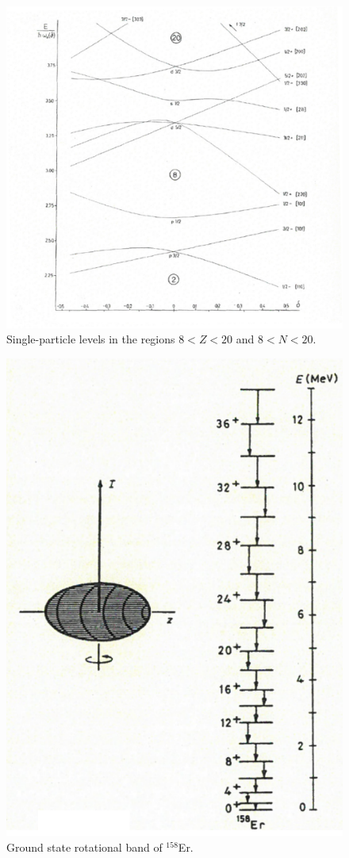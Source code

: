 \begin{figure}
	\centerline {
		\includegraphics*[width=15cm, angle=0.]{introduccion/figs/fig0_4_2_v4}
	}
	\caption{Single-particle levels in the regions $8<Z<20$ and $8<N<20$.}
	\label{fig0.4.1}
\end{figure}
\begin{figure}
	\centerline {
		\includegraphics*[width=12cm, angle=0.]{introduccion/figs/fig0_4_2_v3}
	}
	\caption{Ground state rotational band of $^{158}$Er.}
	\label{fig0.4.2}
\end{figure}
